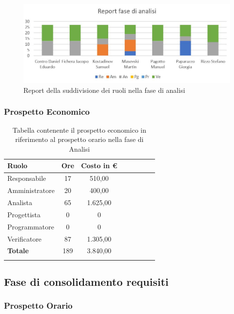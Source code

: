 \documentclass[../piano_di_progetto.tex]{subfiles}
\begin{document}
\begin{figure}[H]
\centering
\includegraphics[width=12cm]{img/report_analisi}
\caption{Report della suddivisione dei ruoli nella fase di analisi}
\end{figure}

\subsubsection{Prospetto Economico}


\begin{longtable}{|l|c|c|c|c|c|c|c|}
	\hline
	\rowcolor{lightgray}
	\textbf{Ruolo} & \textbf{Ore} & \textbf{Costo in €}\\
	\endhead
	\hline
	Responsabile & 17 & 510,00 \\
	\hline
	Amministratore & 20 & 400,00 \\
	\hline
	Analista & 65 & 1.625,00 \\
	\hline
	Progettista & 0 & 0 \\
	\hline
	Programmatore & 0 & 0 \\
	\hline
	Verificatore & 87 & 1.305,00 \\
	\hline
	\textbf{Totale} & 189 & 3.840,00 \\
	\hline
	\caption{Tabella contenente il prospetto economico in riferimento al prospetto orario nella fase di Analisi} 
\end{longtable}


\subsection{ Fase di consolidamento requisiti}%
\label{sub:fase_cons}
\subsubsection{Prospetto Orario}
\end{document}
